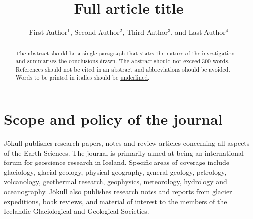 \documentclass{jokull}
\begin{document}
\title[Abbreviated title]{Full article title}

\author[Author et al.]{
    First Author$^1$, Second Author$^2$, Third Author$^3$, and Last Author$^4$
}



\setcounter{page}{1} %

\begin{frontmatter}

\maketitle

\begin{abstract}
    The abstract should be a single paragraph that states the nature of the investigation and summarises the conclusions drawn. The abstract should not exceed 300 words. References should not be cited in an abstract and abbreviations should be avoided. Words to be printed in italics should be \underline{underlined}. 
\end{abstract}

\end{frontmatter}



\section{Scope and policy of the journal}

Jökull publishes research papers, notes and review articles concerning all aspects of the Earth Sciences. The journal is primarily aimed at being an international forum for geoscience research in Iceland. Specific areas of coverage include glaciology, glacial geology, physical geography, general geology, petrology, volcanology, geothermal research, geophysics, meteorology, hydrology and oceanography. Jökull also publishes research notes and reports from glacier expeditions, book reviews, and material of interest to the members of the Icelandic Glaciological and Geological Societies.
\end{document}
